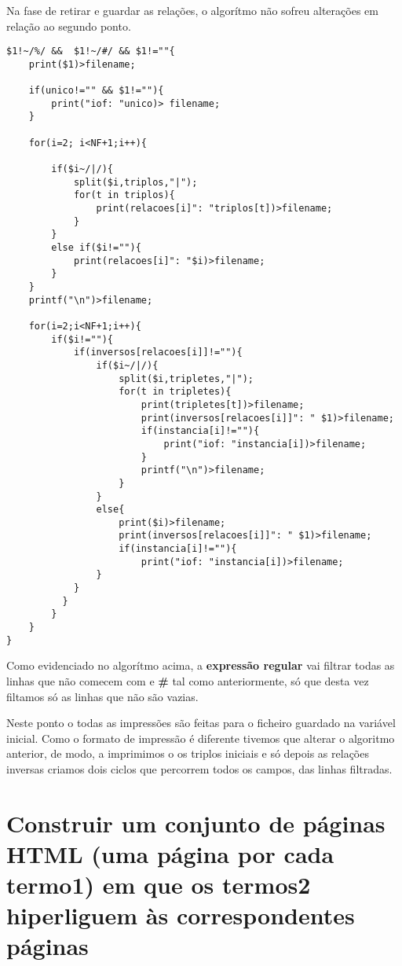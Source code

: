 \documentclass{report}
\def\titulo#1{\section{#1}}
\begin{document}
    Na fase de retirar e guardar as relações, o algorítmo não sofreu alterações em relação ao segundo ponto.

\begin{verbatim}
$1!~/%/ &&  $1!~/#/ && $1!=""{  
    print($1)>filename;
    
    if(unico!="" && $1!=""){
        print("iof: "unico)> filename;
    }

    for(i=2; i<NF+1;i++){
                            
        if($i~/|/){
            split($i,triplos,"|");
            for(t in triplos){
                print(relacoes[i]": "triplos[t])>filename;
            }
        }
        else if($i!=""){
            print(relacoes[i]": "$i)>filename;
        }
    }
    printf("\n")>filename;

    for(i=2;i<NF+1;i++){
        if($i!=""){
            if(inversos[relacoes[i]]!=""){
                if($i~/|/){
                    split($i,tripletes,"|");
                    for(t in tripletes){
                        print(tripletes[t])>filename;
                        print(inversos[relacoes[i]]": " $1)>filename;
                        if(instancia[i]!=""){
                            print("iof: "instancia[i])>filename;
                        }
                        printf("\n")>filename;
                    }
                }
                else{
                    print($i)>filename;
                    print(inversos[relacoes[i]]": " $1)>filename;
                    if(instancia[i]!=""){
                        print("iof: "instancia[i])>filename;
                }
            }
          }
        }
    }
}                          
\end{verbatim}

    Como evidenciado no algorítmo acima, a \textbf{expressão regular} vai filtrar todas as linhas que não comecem com \texbf{\%} e \textbf{\#} tal como anteriormente, só que desta vez filtamos só as linhas que não são vazias.

    Neste ponto o todas as impressões são feitas para o ficheiro guardado na variável inicial. Como o formato de impressão é diferente tivemos que alterar o algoritmo anterior, de modo, a imprimimos o os triplos iniciais e só depois as relações inversas criamos dois ciclos que percorrem todos os campos, das linhas filtradas.



\titulo{ Construir um conjunto de páginas HTML (uma página por cada termo1) em que os termos2 hiperliguem às correspondentes páginas }
\end{document}
